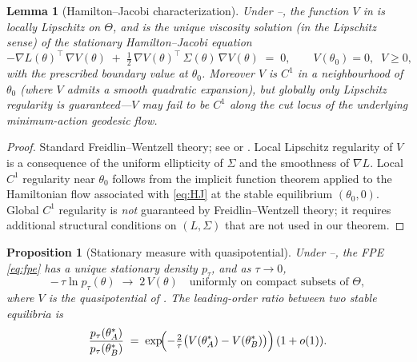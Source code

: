 \documentclass[11pt,a4paper]{article}
\newtheorem{proposition}[theorem]{Proposition}
\newtheorem{lemma}[theorem]{Lemma}
\theoremstyle{definition}
\theoremstyle{remark}
\begin{document}
\begin{lemma}[Hamilton--Jacobi characterization]\label{lem:HJ}
   Under --, the function $V$ in
    is locally Lipschitz on $\Theta$, and is the unique
   viscosity solution (in the Lipschitz sense) of the stationary
   Hamilton--Jacobi equation
   \begin{equation}\label{eq:HJ}
      -\nabla L(\theta)^{\!\top}\,\nabla V(\theta)
      \;+\; \tfrac{1}{2}\,\nabla V(\theta)^{\!\top}\,\Sigma(\theta)\,
            \nabla V(\theta)
      \;=\; 0,
      \qquad V(\theta_0) = 0,\;\; V\geq 0,
   \end{equation}
   with the prescribed boundary value at $\theta_0$.  Moreover $V$ is
   $C^1$ in a neighbourhood of $\theta_0$ (where $V$ admits a smooth
   quadratic expansion), but globally only Lipschitz regularity is
   guaranteed---$V$ may fail to be $C^1$ along the cut locus of the
   underlying minimum-action geodesic flow.
\end{lemma}

\begin{proof}
   Standard Freidlin--Wentzell theory; see
   \cite[Chapter~4]{FreidlinWentzell2012} or
   \cite[Theorem~5.7.11]{DemboZeitouni2010}.  Local Lipschitz regularity
   of $V$ is a consequence of the uniform ellipticity of $\Sigma$ and
   the smoothness of $\nabla L$.  Local $C^1$ regularity near
   $\theta_0$ follows from the implicit function theorem applied to
   the Hamiltonian flow associated with \eqref{eq:HJ} at the stable
   equilibrium $(\theta_0,0)$.  Global $C^1$ regularity is \emph{not}
   guaranteed by Freidlin--Wentzell theory; it requires additional
   structural conditions on $(L,\Sigma)$ that are not used in our
   theorem.
\end{proof}

\begin{proposition}[Stationary measure with quasipotential]
   \label{prop:stationary-multi}
   Under --, the FPE \eqref{eq:fpe} has a unique
   stationary density $p_\tau$, and as $\tau\to 0$,
   \[
      -\,\tau \ln p_\tau(\theta) \;\longrightarrow\; 2\,V(\theta)
      \quad \text{uniformly on compact subsets of }\Theta,
   \]
   where $V$ is the quasipotential of .  The leading-order
   ratio between two stable equilibria is
   \[
      \frac{p_\tau(\theta_A^*)}{p_\tau(\theta_B^*)}
      \;=\; \exp\!\Bigl(-\tfrac{2}{\tau}\bigl(V(\theta_A^*)
                                              - V(\theta_B^*)\bigr)\Bigr)\,
            (1 + o(1)).
   \]
\end{proposition}
\end{document}
